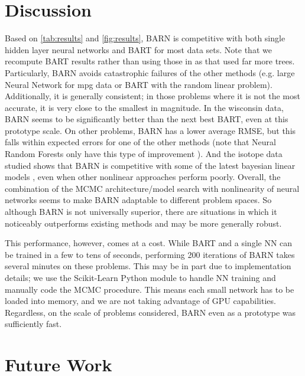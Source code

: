 \documentclass[12pt]{article}
\begin{document}
\section{Discussion}\label{sec:dis}

Based on \autoref{tab:results} and \autoref{fig:results}, BARN is competitive with both single hidden layer neural networks and BART for most data sets.  Note that we recompute BART results rather than using those in \cite{biau2019neural} as that used far more trees.  Particularly, BARN avoids catastrophic failures of the other methods (e.g. large Neural Network for mpg data or BART with the random linear problem).  Additionally, it is generally consistent; in those problems where it is not the most accurate, it is very close to the smallest in magnitude.  In the wisconsin data, BARN seems to be significantly better than the next best BART, even at this prototype scale.  On other problems, BARN has a lower average RMSE, but this falls within expected errors for one of the other methods (note that Neural Random Forests only have this type of improvement \cite{biau2019neural}).  And the isotope data studied shows that BARN is competitive with some of the latest bayesian linear models \cite{roman2022bayclump}, even when other nonlinear approaches perform poorly.  Overall, the combination of the MCMC architecture/model search with nonlinearity of neural networks seems to make BARN adaptable to different problem spaces.  So although BARN is not universally superior, there are situations in which it noticeably outperforms existing methods and may be more generally robust.

This performance, however, comes at a cost.  While BART and a single NN can be trained in a few to tens of seconds, performing 200 iterations of BARN takes several minutes on these problems.  This may be in part due to implementation details; we use the Scikit-Learn Python module to handle NN training \cite{scikit-learn} and manually code the MCMC procedure.  This means each small network has to be loaded into memory, and we are not taking advantage of GPU capabilities.  Regardless, on the scale of problems considered, BARN even as a prototype was sufficiently fast.

\section{Future Work}\label{sec:future}
\end{document}

